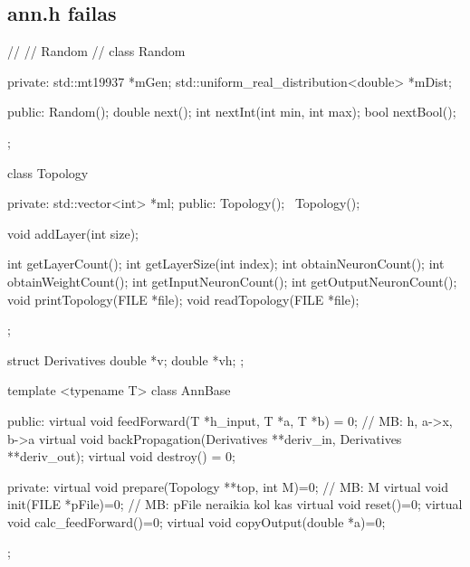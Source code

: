 \subsection{ann.h failas}

//
// Random
//
class Random {
  private:
    std::mt19937 *mGen;
    std::uniform\_real\_distribution<double> *mDist;

  public:
    Random();
    double next();
    int nextInt(int min, int max);
    bool nextBool();
};


class Topology {
	private:
		std::vector<int> *ml;
	public:
		Topology();
		~Topology();

		void addLayer(int size);

		int getLayerCount();
		int getLayerSize(int index);
		int obtainNeuronCount();
		int obtainWeightCount();
		int getInputNeuronCount();
		int getOutputNeuronCount();
    void printTopology(FILE *file);
    void readTopology(FILE *file);
};

struct Derivatives{
  double *v;
  double *vh;
};

template <typename T>
class AnnBase {
  public:
    virtual void feedForward(T *h\_input, T *a, T *b) = 0; // MB: h, a->x, b->a
    virtual void backPropagation(Derivatives **deriv\_in, Derivatives **deriv\_out);
    virtual void destroy() = 0;

  private:
    virtual void prepare(Topology **top, int M)=0; // MB: M
    virtual	void init(FILE *pFile)=0; // MB: pFile neraikia kol kas
    virtual void reset()=0;
    virtual void calc\_feedForward()=0;
    virtual void copyOutput(double *a)=0;
};



